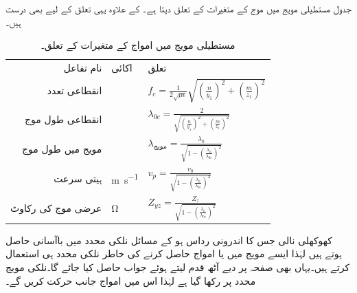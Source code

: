 
جدول  مستطیلی مویج میں  موج کے متغیرات کے تعلق دیتا ہے۔ کے علاوہ یہی تعلق  کے لیے بھی درست ہیں۔

\begin{table}[h!]
\caption{مستطیلی مویج میں  امواج کے متغیرات کے تعلق۔}
\centering
\begin{tabular}{rll}
نام تفاعل & اکائی& تعلق\\
انقطاعی تعدد & {\si{\hertz}} & $f_c=\frac{1}{2\sqrt{\mu \epsilon}}\sqrt{\left(\frac{n}{y_1}\right)^2+\left(\frac{m}{z_1}\right)^2}$\\
انقطاعی طول موج &  {\si{\meter}}& $ \lambda_{0c}=\frac{2}{\sqrt{\left(\frac{n}{y_1}\right)^2+\left(\frac{m}{z_1}\right)^2}}$\\
مویج میں طول موج& {\si{\meter}} & $\lambda_{\text{مویج}}=\frac{\lambda_0}{\sqrt{1-\left(\frac{\lambda_0}{\lambda_{0c}}\right)^2}}$\\
ہیتی سرعت & \si{\meter\per\second} & $v_p=\frac{v_0}{\sqrt{1-\left(\frac{\lambda_0}{\lambda_{0c}}\right)^2}}$\\
عرضی موج کی رکاوٹ & \si{\ohm} & $Z_{yz}=\frac{Z_z}{\sqrt{1-\left(\frac{\lambda_0}{\lambda_{0c}}\right)^2}}$
\end{tabular}
\label{جدول_مویج_مستطیلی_مویج_تعلق}
\end{table}

کھوکھلی نالی جس کا اندرونی رداس  ہو کے مسائل نلکی محدد میں باآسانی حاصل ہوتے ہیں لہٰذا ایسے مویج میں  یا  امواج حاصل کرنے کی خاطر نلکی محدد ہی استعمال کرتے ہیں۔یہاں بھی صفحہ  پر دیے آٹھ قدم  لیتے ہوئے جواب حاصل کیا جائے گا۔نلکی مویج  محدد پر رکھا گیا ہے لہٰذا اس  میں امواج  جانب حرکت کریں گے۔


